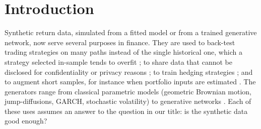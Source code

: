 \section{Introduction}\label{sec:intro}

Synthetic return data, simulated from a fitted model or from a trained generative network, now
serve several purposes in finance. They are used to back-test trading strategies on many paths
instead of the single historical one, which a strategy selected in-sample tends to overfit
\citep{bailey2017probability}; to share data that cannot be disclosed for confidentiality or
privacy reasons \citep{assefa2020generating}; to train hedging strategies
\citep{buehler2019deep,kondratyev2019market}; and to augment short samples, for instance when
portfolio inputs are estimated \citep{buehler2020data,cetingoz2026synthetic}. The generators
range from classical parametric models (geometric Brownian motion, jump-diffusions, GARCH,
stochastic volatility) to generative networks
\citep{wiese2020quant,takahashi2019modeling,buehler2020data,ni2021sig}. Each of these uses
assumes an answer to the question in our title: is the synthetic data good enough?

